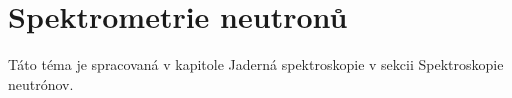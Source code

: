 \documentclass[../../main.tex]{subfiles}
\begin{document}
\section{Spektrometrie neutronů}

Táto téma je spracovaná v kapitole Jaderná spektroskopie v sekcii Spektroskopie neutrónov.
\end{document}
